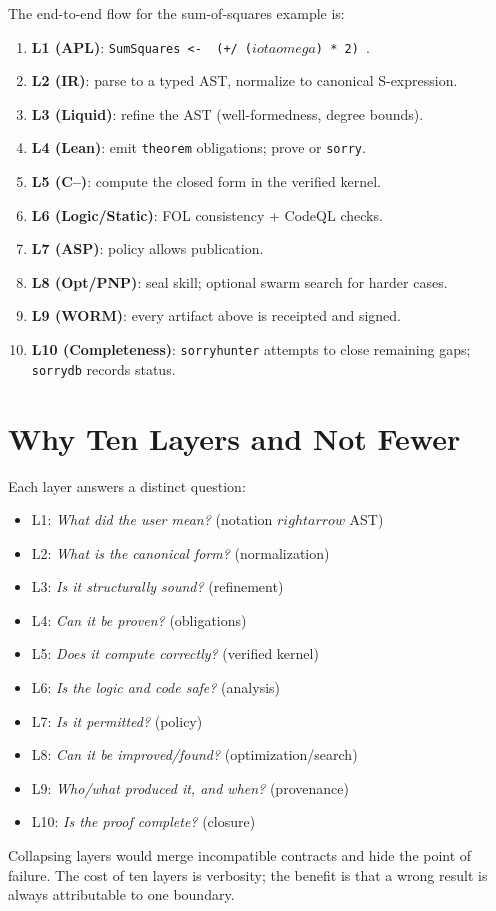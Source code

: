 The end-to-end flow for the sum-of-squares example is:
\begin{enumerate}
  \item \textbf{L1 (APL)}: \texttt{SumSquares <- { (+/ (\ensuremath{iota}\ensuremath{omega}) * 2) }}.
  \item \textbf{L2 (IR)}: parse to a typed AST, normalize to canonical
        S-expression.
  \item \textbf{L3 (Liquid)}: refine the AST (well-formedness, degree bounds).
  \item \textbf{L4 (Lean)}: emit \texttt{theorem} obligations; prove or
        \texttt{sorry}.
  \item \textbf{L5 (C{--})}: compute the closed form in the verified kernel.
  \item \textbf{L6 (Logic/Static)}: FOL consistency + CodeQL checks.
  \item \textbf{L7 (ASP)}: policy allows publication.
  \item \textbf{L8 (Opt/PNP)}: seal skill; optional swarm search for harder
        cases.
  \item \textbf{L9 (WORM)}: every artifact above is receipted and signed.
  \item \textbf{L10 (Completeness)}: \texttt{sorryhunter} attempts to close
        remaining gaps; \texttt{sorrydb} records status.
\end{enumerate}

\section{Why Ten Layers and Not Fewer}
\label{sec:vscp-why}

Each layer answers a distinct question:
\begin{itemize}
  \item L1: \emph{What did the user mean?} (notation $\ensuremath{rightarrow}$ AST)
  \item L2: \emph{What is the canonical form?} (normalization)
  \item L3: \emph{Is it structurally sound?} (refinement)
  \item L4: \emph{Can it be proven?} (obligations)
  \item L5: \emph{Does it compute correctly?} (verified kernel)
  \item L6: \emph{Is the logic and code safe?} (analysis)
  \item L7: \emph{Is it permitted?} (policy)
  \item L8: \emph{Can it be improved/found?} (optimization/search)
  \item L9: \emph{Who/what produced it, and when?} (provenance)
  \item L10: \emph{Is the proof complete?} (closure)
\end{itemize}
Collapsing layers would merge incompatible contracts and hide the point of
failure. The cost of ten layers is verbosity; the benefit is that a wrong
result is always attributable to one boundary.

